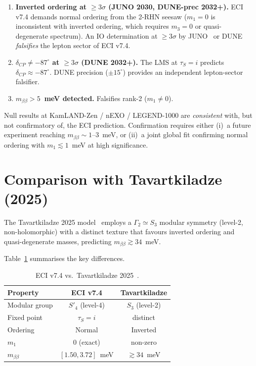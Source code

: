 \documentclass[aps,prl,twocolumn,showpacs,superscriptaddress]{revtex4-2}
\newcommand{\mbb}{m_{\beta\beta}}
\begin{document}
\begin{enumerate}
\item[\textbf{F8d}] \textbf{Inverted ordering at $\geq3\sigma$
  (JUNO 2030, DUNE-prec 2032+).}
  ECI v7.4 demands normal ordering from the 2-RHN seesaw
  ($m_1=0$ is inconsistent with inverted ordering, which requires
  $m_3 = 0$ or quasi-degenerate spectrum).  An IO determination at
  $\geq 3\sigma$ by JUNO~\cite{JUNO22} or DUNE~\cite{DUNE20}
  \emph{falsifies} the lepton sector of ECI v7.4.

\item[\textbf{F8a}] \textbf{$\delta_{CP}\neq -87^\circ$ at
  $\geq3\sigma$ (DUNE 2032+).}
  The LMS at $\tau_S=i$ predicts $\delta_{CP}\approx-87^\circ$.
  DUNE precision ($\pm15^\circ$) provides an independent
  lepton-sector falsifier.

\item[\textbf{F8b/c}] \textbf{$\mbb > 5$~meV detected.}
  Falsifies rank-2 ($m_1\neq0$).
\end{enumerate}

Null results at KamLAND-Zen / nEXO / LEGEND-1000 are
\emph{consistent} with, but not confirmatory of, the ECI
prediction.  Confirmation requires either (i)~a future experiment
reaching $\mbb\sim1$--$3$~meV, or (ii)~a joint global fit
confirming normal ordering with $m_1 \lesssim 1$~meV at high
significance.

\section{Comparison with Tavartkiladze (2025)}
\label{sec:compare}

The Tavartkiladze 2025 model~\cite{Tav25} employs a
$\Gamma_2\simeq S_3$ modular symmetry (level-2, non-holomorphic)
with a distinct texture that favours inverted ordering and
quasi-degenerate masses, predicting $\mbb\gtrsim34$~meV.

Table~\ref{tab:compare} summarises the key differences.

\begin{table}[h]
\centering
\caption{ECI v7.4 vs.\ Tavartkiladze 2025~\cite{Tav25}.}
\label{tab:compare}
\begin{tabular}{lcc}
\toprule
Property & ECI v7.4 & Tavartkiladze \\
\midrule
Modular group  & $S'_4$ (level-4) & $S_3$ (level-2) \\
Fixed point    & $\tau_S = i$     & distinct \\
Ordering       & Normal           & Inverted \\
$m_1$          & $0$ (exact)      & non-zero \\
$\mbb$         & $[1.50,3.72]$~meV & $\gtrsim34$~meV \\
\bottomrule
\end{tabular}
\end{table}
\end{document}
